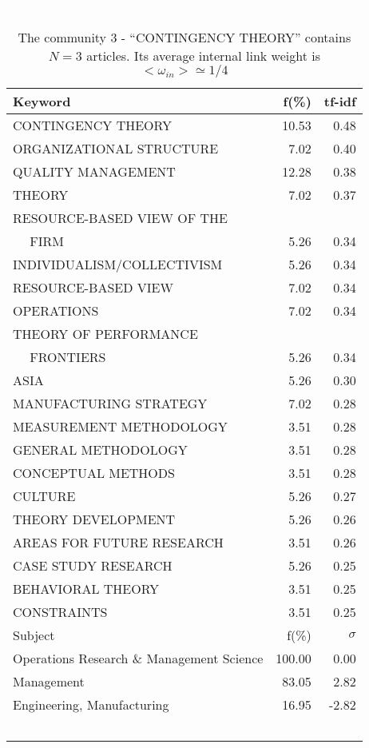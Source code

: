 \documentclass[a4paper,11pt]{report}
\begin{document}
\begin{landscape}
\begin{table}[!ht]
\caption{The community 3 - ``CONTINGENCY THEORY'' contains $N = 3$ articles. Its average internal link weight is $<\omega_{in}> \simeq 1/4$ }
\textcolor{white}{aa}\\
{\scriptsize\begin{tabular}{|l r  r|}
\hline
Keyword & f(\%) & tf-idf \\
\hline
CONTINGENCY THEORY & 10.53 & 0.48\\
ORGANIZATIONAL STRUCTURE & 7.02 & 0.40\\
QUALITY MANAGEMENT & 12.28 & 0.38\\
THEORY & 7.02 & 0.37\\
RESOURCE-BASED VIEW OF THE &  &\\
$\quad$ FIRM & 5.26 & 0.34\\
INDIVIDUALISM/COLLECTIVISM & 5.26 & 0.34\\
RESOURCE-BASED VIEW & 7.02 & 0.34\\
OPERATIONS & 7.02 & 0.34\\
THEORY OF PERFORMANCE &  &\\
$\quad$ FRONTIERS & 5.26 & 0.34\\
ASIA & 5.26 & 0.30\\
MANUFACTURING STRATEGY & 7.02 & 0.28\\
MEASUREMENT METHODOLOGY & 3.51 & 0.28\\
GENERAL METHODOLOGY & 3.51 & 0.28\\
CONCEPTUAL METHODS & 3.51 & 0.28\\
CULTURE & 5.26 & 0.27\\
THEORY DEVELOPMENT & 5.26 & 0.26\\
AREAS FOR FUTURE RESEARCH & 3.51 & 0.26\\
CASE STUDY RESEARCH & 5.26 & 0.25\\
BEHAVIORAL THEORY & 3.51 & 0.25\\
CONSTRAINTS & 3.51 & 0.25\\
\hline
\hline
Subject & f(\%) & $\sigma$\\
\hline
Operations Research \& Management Science & 100.00 & 0.00\\
Management & 83.05 & 2.82\\
Engineering, Manufacturing & 16.95 & -2.82\\
 &  & \\
 &  & \\
 &  & \\
 &  & \\
 &  & \\

\end{tabular}}
\end{table}
\end{landscape}
\end{document}
